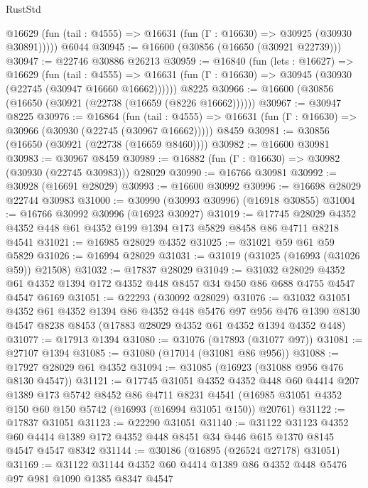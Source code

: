 \begin{lexlean}{RustStd}
\begin{coremodule}
{\begin{coremodule}
{{{{{{{{{{{{{{{{{{{{{{{{{{{{{{{{{{{{{{{{{{{{{{{{{{{{{{{      @16629 (fun (tail : @4555) => @16631 (fun (Γ : @16630) => @30925 (@30930 @30891)))))
    @6044
@30945 := @16600 (@30856 (@16650 (@30921 @22739)))
@30947 := @22746 @30886 @26213
@30959 := @16840
    (fun (lets : @16627) =>
    @16629
      (fun (tail : @4555) =>
      @16631 (fun (Γ : @16630) => @30945 (@30930 (@22745 (@30947 @16660 @16662))))))
    @8225
@30966 := @16600 (@30856 (@16650 (@30921 (@22738 (@16659 (@8226 @16662))))))
@30967 := @30947 @8225
@30976 := @16864
    (fun (tail : @4555) => @16631 (fun (Γ : @16630) => @30966 (@30930 (@22745 (@30967 @16662)))))
    @8459
@30981 := @30856 (@16650 (@30921 (@22738 (@16659 @8460))))
@30982 := @16600 @30981
@30983 := @30967 @8459
@30989 := @16882 (fun (Γ : @16630) => @30982 (@30930 (@22745 @30983))) @28029
@30990 := @16766 @30981
@30992 := @30928 (@16691 @28029)
@30993 := @16600 @30992
@30996 := @16698 @28029 @22744 @30983
@31000 := @30990 (@30993 @30996) (@16918 @30855)
@31004 := @16766 @30992 @30996 (@16923 @30927)
@31019 := @17745 @28029 @4352 @4352 @448 @61 @4352 @199 @1394 @173 @5829 @8458 @86 @4711 @8218 @4541
@31021 := @16985 @28029 @4352
@31025 := @31021 @59 @61 @59 @5829
@31026 := @16994 @28029
@31031 := @31019 (@31025 (@16993 (@31026 @59)) @21508)
@31032 := @17837 @28029
@31049 := @31032
    @28029
    @4352
    @61
    @4352
    @1394
    @172
    @4352
    @448
    @8457
    @34
    @450
    @86
    @688
    @4755
    @4547
    @4547
    @6169
@31051 := @22293 (@30092 @28029)
@31076 := @31032
    @31051
    @4352
    @61
    @4352
    @1394
    @86
    @4352
    @448
    @5476
    @97
    @956
    @476
    @1390
    @8130
    @4547
    @8238
    @8453
    (@17883 @28029 @4352 @61 @4352 @1394 @4352 @448)
@31077 := @17913 @1394
@31080 := @31076 (@17893 (@31077 @97))
@31081 := @27107 @1394
@31085 := @31080 (@17014 (@31081 @86 @956))
@31088 := @17927 @28029 @61 @4352
@31094 := @31085 (@16923 (@31088 @956 @476 @8130 @4547))
@31121 := @17745
    @31051
    @4352
    @4352
    @448
    @60
    @4414
    @207
    @1389
    @173
    @5742
    @8452
    @86
    @4711
    @8231
    @4541
    (@16985 @31051 @4352 @150 @60 @150 @5742 (@16993 (@16994 @31051 @150)) @20761)
@31122 := @17837 @31051
@31123 := @22290 @31051
@31140 := @31122
    @31123
    @4352
    @60
    @4414
    @1389
    @172
    @4352
    @448
    @8451
    @34
    @446
    @615
    @1370
    @8145
    @4547
    @4547
    @8342
@31144 := @30186 (@16895 (@26524 @27178) @31051)
@31169 := @31122
    @31144
    @4352
    @60
    @4414
    @1389
    @86
    @4352
    @448
    @5476
    @97
    @981
    @1090
    @1385
    @8347
    @4547
}}}}}}}}}}}}}}}}}}}}}}}}}}}}}}}}}}}}}}}}}}}}}}}}}}}}}}}
\end{coremodule}}
\end{coremodule}
\end{lexlean}
